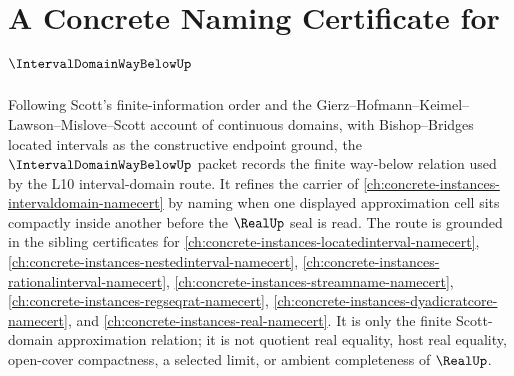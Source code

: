 \chapter{A Concrete Naming Certificate for $\IntervalDomainWayBelowUp$}
\label{ch:concrete-instances-intervaldomainwaybelow-namecert}

Following Scott's finite-information order and the Gierz--Hofmann--Keimel--Lawson--Mislove--Scott account of continuous domains, with Bishop--Bridges located intervals as the constructive endpoint ground, the $\IntervalDomainWayBelowUp$ packet records the finite way-below relation used by the L10 interval-domain route. It refines the carrier of \autoref{ch:concrete-instances-intervaldomain-namecert} by naming when one displayed approximation cell sits compactly inside another before the $\RealUp$ seal is read. The route is grounded in the sibling certificates for \autoref{ch:concrete-instances-locatedinterval-namecert}, \autoref{ch:concrete-instances-nestedinterval-namecert}, \autoref{ch:concrete-instances-rationalinterval-namecert}, \autoref{ch:concrete-instances-streamname-namecert}, \autoref{ch:concrete-instances-regseqrat-namecert}, \autoref{ch:concrete-instances-dyadicratcore-namecert}, and \autoref{ch:concrete-instances-real-namecert}. It is only the finite Scott-domain approximation relation; it is not quotient real equality, host real equality, open-cover compactness, a selected limit, or ambient completeness of $\RealUp$.

